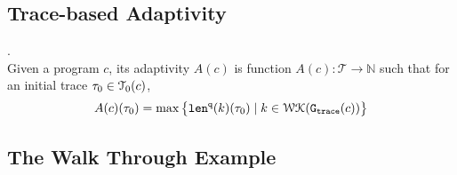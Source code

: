 %
\subsection{Trace-based Adaptivity}

\begin{defn}
    .
    \label{def:trace_adapt}
    \\
    Given a program ${c}$, 
    its adaptivity $A(c)$ is function 
    $A(c) : \mathcal{T} \to \mathbb{N}$ such that for an
    initial trace $\mathtt{\tau}_0 \in \mathcal{T}_0(c)$, 
   $$
    A(c)(\mathtt{\tau}_0) = \max \big 
    \{ \mathtt{len}^{\tt q}(k)(\mathtt{\tau}_0) \mid k \in \mathcal{WK}(\mathtt{{G_{trace}}}(c)) \big \} $$
    \end{defn}

\subsection{The Walk Through Example}
